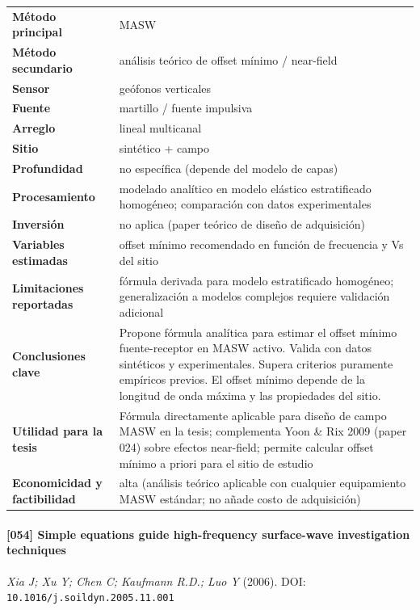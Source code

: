\begin{center}\scriptsize
\begin{tabularx}{\textwidth}{@{}>{\bfseries}p{3.3cm} X@{}}
\toprule
M\'etodo principal & MASW \\
M\'etodo secundario & análisis teórico de offset mínimo / near-field \\
Sensor & geófonos verticales \\
Fuente & martillo / fuente impulsiva \\
Arreglo & lineal multicanal \\
Sitio & sintético + campo \\
Profundidad & no específica (depende del modelo de capas) \\
Procesamiento & modelado analítico en modelo elástico estratificado homogéneo; comparación con datos experimentales \\
Inversi\'on & no aplica (paper teórico de diseño de adquisición) \\
Variables estimadas & offset mínimo recomendado en función de frecuencia y Vs del sitio \\
Limitaciones reportadas & fórmula derivada para modelo estratificado homogéneo; generalización a modelos complejos requiere validación adicional \\
Conclusiones clave & Propone fórmula analítica para estimar el offset mínimo fuente-receptor en MASW activo. Valida con datos sintéticos y experimentales. Supera criterios puramente empíricos previos. El offset mínimo depende de la longitud de onda máxima y las propiedades del sitio. \\
Utilidad para la tesis & Fórmula directamente aplicable para diseño de campo MASW en la tesis; complementa Yoon \& Rix 2009 (paper 024) sobre efectos near-field; permite calcular offset mínimo a priori para el sitio de estudio \\
Economicidad y factibilidad & alta (análisis teórico aplicable con cualquier equipamiento MASW estándar; no añade costo de adquisición) \\
\bottomrule
\end{tabularx}
\end{center}

\paragraph{[054] Simple equations guide high-frequency surface-wave investigation techniques} \emph{Xia J; Xu Y; Chen C; Kaufmann R.D.; Luo Y} (2006).
{\scriptsize DOI: \texttt{10.1016/j.soildyn.2005.11.001}}

